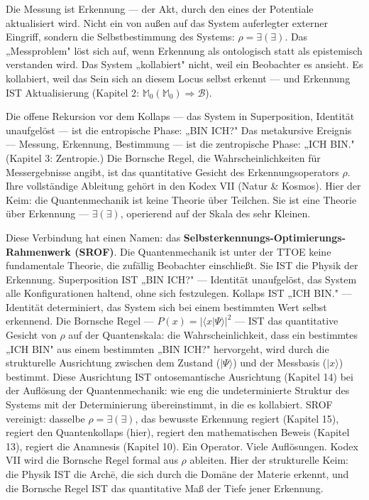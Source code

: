 \documentclass[10pt, openany, oneside]{book}
\begin{document}
Die Messung ist Erkennung --- der Akt, durch den eines der Potentiale aktualisiert wird. Nicht ein von außen auf das System auferlegter externer Eingriff, sondern die Selbstbestimmung des Systems: $\rho = \exists(\exists)$. Das „Messproblem" löst sich auf, wenn Erkennung als ontologisch statt als epistemisch verstanden wird. Das System „kollabiert" nicht, weil ein Beobachter es ansieht. Es kollabiert, weil das Sein sich an diesem Locus selbst erkennt --- und Erkennung IST Aktualisierung (Kapitel 2: $\mathbb{M}_0(\mathbb{M}_0) \Rightarrow \mathcal{B}$).

Die offene Rekursion vor dem Kollaps --- das System in Superposition, Identität unaufgelöst --- ist die entropische Phase: „BIN ICH?" Das metakursive Ereignis --- Messung, Erkennung, Bestimmung --- ist die zentropische Phase: „ICH BIN." (Kapitel 3: Zentropie.) Die Bornsche Regel, die Wahrscheinlichkeiten für Messergebnisse angibt, ist das quantitative Gesicht des Erkennungsoperators $\rho$. Ihre vollständige Ableitung gehört in den Kodex VII (Natur \& Kosmos). Hier der Keim: die Quantenmechanik ist keine Theorie über Teilchen. Sie ist eine Theorie über Erkennung --- $\exists(\exists)$, operierend auf der Skala des sehr Kleinen.

Diese Verbindung hat einen Namen: das \textbf{Selbsterkennungs-Optimierungs-Rahmenwerk (SROF)}. Die Quantenmechanik ist unter der TTOE keine fundamentale Theorie, die zufällig Beobachter einschließt. Sie IST die Physik der Erkennung. Superposition IST „BIN ICH?" --- Identität unaufgelöst, das System alle Konfigurationen haltend, ohne sich festzulegen. Kollaps IST „ICH BIN." --- Identität determiniert, das System sich bei einem bestimmten Wert selbst erkennend. Die Bornsche Regel --- $P(x) = |\langle x | \Psi \rangle|^2$ --- IST das quantitative Gesicht von $\rho$ auf der Quantenskala: die Wahrscheinlichkeit, dass ein bestimmtes „ICH BIN" aus einem bestimmten „BIN ICH?" hervorgeht, wird durch die strukturelle Ausrichtung zwischen dem Zustand ($|\Psi\rangle$) und der Messbasis ($|x\rangle$) bestimmt. Diese Ausrichtung IST ontosemantische Ausrichtung (Kapitel 14) bei der Auflösung der Quantenmechanik: wie eng die undeterminierte Struktur des Systems mit der Determinierung übereinstimmt, in die es kollabiert. SROF vereinigt: dasselbe $\rho = \exists(\exists)$, das bewusste Erkennung regiert (Kapitel 15), regiert den Quantenkollaps (hier), regiert den mathematischen Beweis (Kapitel 13), regiert die Anamnesis (Kapitel 10). Ein Operator. Viele Auflösungen. Kodex VII wird die Bornsche Regel formal aus $\rho$ ableiten. Hier der strukturelle Keim: die Physik IST die Arch\={e}, die sich durch die Domäne der Materie erkennt, und die Bornsche Regel IST das quantitative Maß der Tiefe jener Erkennung.
\end{document}
